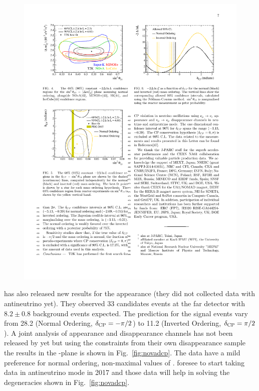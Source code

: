 \begin{figure} [h!]
\begin{center}
\includegraphics[width=14cm]{figures/t2k_dcp_1D.pdf}
\caption{\label{fig:t2kdcp}  }
\end{center}
\end{figure}

 
\nova has also released new results for the \nue appearance (they did not collected data with antineutrino yet). They observed 33 \nue candidates events at the far detector with $8.2\pm0.8$ background events expected. The prediction for the signal events vary from 28.2 (Normal Ordering, $\delta_{\mathrm{CP}}=-\pi/2$) to 11.2 (Inverted Ordering, $\delta_{\mathrm{CP}}=\pi/2$). A joint analysis of appearance and disappearance channels has not been released by \nova yet but using the constraints from their own disappearance sample the results in the \stt-\dcp plane is shown in Fig.~\ref{fig:novadcp}. The data have a mild preference for normal ordering, non-maximal values of \stt. \nova foresee to start taking data in antineutrino mode in 2017 and those data will help in solving the degeneracies shown in Fig.~\ref{fig:novadcp}. 

